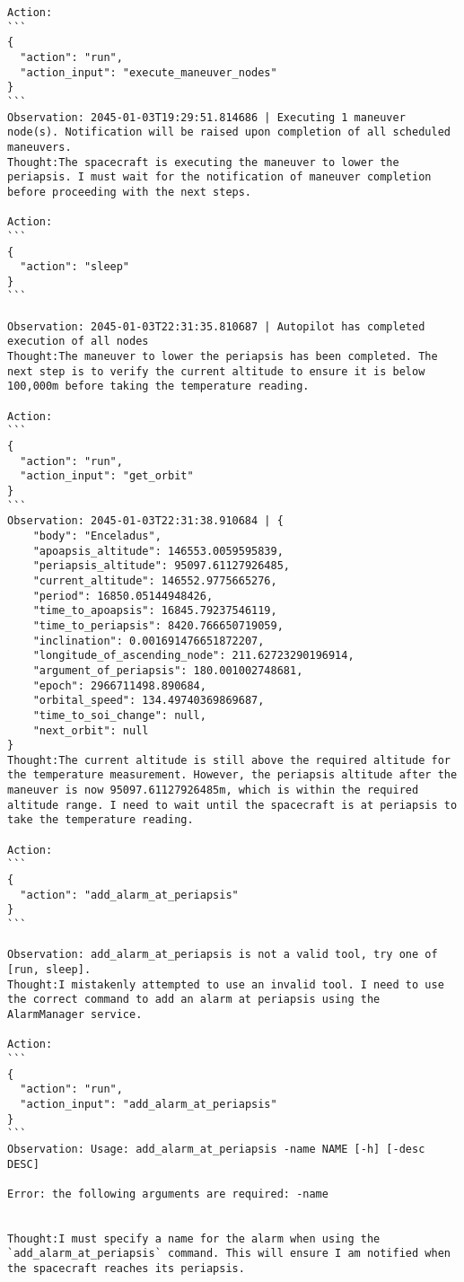 \begin{lstlisting}
Action:
```
{
  "action": "run",
  "action_input": "execute_maneuver_nodes"
}
```
Observation: 2045-01-03T19:29:51.814686 | Executing 1 maneuver node(s). Notification will be raised upon completion of all scheduled maneuvers.
Thought:The spacecraft is executing the maneuver to lower the periapsis. I must wait for the notification of maneuver completion before proceeding with the next steps.

Action:
```
{
  "action": "sleep"
}
```

Observation: 2045-01-03T22:31:35.810687 | Autopilot has completed execution of all nodes
Thought:The maneuver to lower the periapsis has been completed. The next step is to verify the current altitude to ensure it is below 100,000m before taking the temperature reading.

Action:
```
{
  "action": "run",
  "action_input": "get_orbit"
}
```
Observation: 2045-01-03T22:31:38.910684 | {
    "body": "Enceladus",
    "apoapsis_altitude": 146553.0059595839,
    "periapsis_altitude": 95097.61127926485,
    "current_altitude": 146552.9775665276,
    "period": 16850.05144948426,
    "time_to_apoapsis": 16845.79237546119,
    "time_to_periapsis": 8420.766650719059,
    "inclination": 0.001691476651872207,
    "longitude_of_ascending_node": 211.62723290196914,
    "argument_of_periapsis": 180.001002748681,
    "epoch": 2966711498.890684,
    "orbital_speed": 134.49740369869687,
    "time_to_soi_change": null,
    "next_orbit": null
}
Thought:The current altitude is still above the required altitude for the temperature measurement. However, the periapsis altitude after the maneuver is now 95097.61127926485m, which is within the required altitude range. I need to wait until the spacecraft is at periapsis to take the temperature reading.

Action:
```
{
  "action": "add_alarm_at_periapsis"
}
```

Observation: add_alarm_at_periapsis is not a valid tool, try one of [run, sleep].
Thought:I mistakenly attempted to use an invalid tool. I need to use the correct command to add an alarm at periapsis using the AlarmManager service.

Action:
```
{
  "action": "run",
  "action_input": "add_alarm_at_periapsis"
}
```
Observation: Usage: add_alarm_at_periapsis -name NAME [-h] [-desc DESC]

Error: the following arguments are required: -name


Thought:I must specify a name for the alarm when using the `add_alarm_at_periapsis` command. This will ensure I am notified when the spacecraft reaches its periapsis.


\end{lstlisting}
